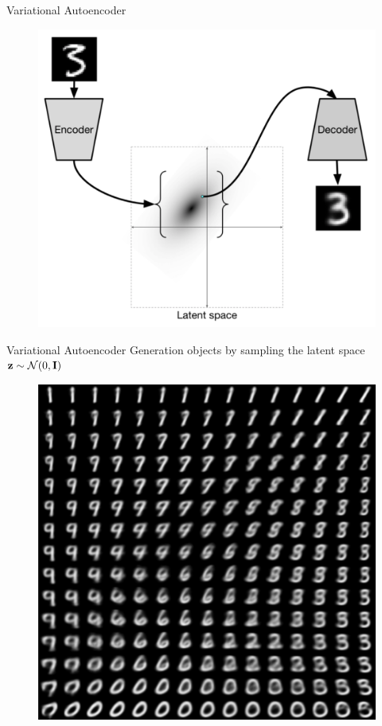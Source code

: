 \begin{frame}{Variational Autoencoder}
\begin{figure}[h]
	\centering
	\includegraphics[width=.7\linewidth]{figs/VAE.png}
\end{figure}
\end{frame}
\begin{frame}{Variational Autoencoder}
Generation objects by sampling the latent space $\mathbf{z} \sim \mathcal{N}(0, \mathbf{I})$
\begin{figure}[h]
	\centering
	\includegraphics[width=.5\linewidth]{figs/vae_0.png}
\end{figure}
\end{frame}
